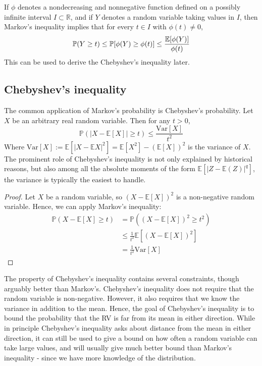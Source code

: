 If $\phi$ denotes a nondecreasing and nonnegative function defined on a possibly infinite interval $I\subset \mathbb{R}$, and if $Y$ denotes a random variable taking values in $I$, then Markov's inequality implies that for every $t\in I$ with $\phi(t)\neq 0$, 
\begin{equation}
    \mathbb{P} (Y\geq t) \leq {\mathbb{P}} [\phi(Y)\geq \phi(t)] \leq \frac{\mathbb{E}[\phi(Y)]}{\phi(t)}
\end{equation}
This can be used to derive the Chebyshev's inequality later. 
\subsection{Chebyshev's inequality}
The common application of Markov's probability is Chebyshev's probability. Let $X$ be an arbitrary real random variable. Then for any $t> 0$, 
\begin{equation}
    \mathbb{P}(|X-\mathbb{E}[X]| \geq t) \leq \frac{\mathrm{Var}[X]}{t^{2}} 
\end{equation}
Where $\mathrm{Var}[X]:= \mathbb{E}[|X-\mathbb{E}X|^{2}]=\mathbb{E}[X^{2}]- (\mathbb{E}[X])^{2}$ is the variance of $X$. The prominent role of Chebyshev's inequality is not only explained by historical reasons, but also among all the absolute moments of the form $\mathbb{E}[|Z-\mathbb{E}(Z)|^{q}]$, the variance is typically the easiest to handle. 
\begin{proof}
    Let $X$ be a random variable, so $(X-\mathbb{E}[X])^{2}$ is a non-negative random variable. Hence, we can apply Markov's inequality: 
    \begin{align}
        \mathbb{P}(X-\mathbb{E}[X]\geq t) & = \mathbb{P}\left((X-\mathbb{E}[X])^{2}\geq t^{2}\right)\\
        & \leq \frac{1}{t^{2}} \mathbb{E} \left[(X-\mathbb{E}[X])^{2}\right]\\
        & = \frac{1}{t^2} \mathrm{Var}[X]
    \end{align}
\end{proof}
The property of Chebyshev's inequality contains several constraints, though arguably better than Markov's. Chebyshev's inequality does not require that the random variable is non-negative. However, it also requires that we know the variance in addition to the mean. Hence, the goal of Chebyshev's inequality is to bound the probability that the RV is far from its mean in either direction. While in principle Chebyshev's inequality asks about distance from the mean in either direction, it can still be used to give a bound on how often a random variable can take large values, and will usually give much better bound than Markov's inequality - since we have more knowledge of the distribution. 

